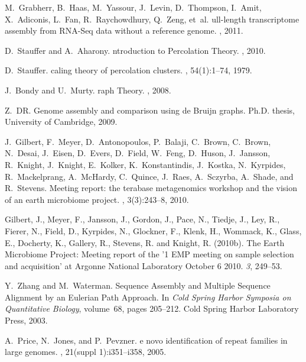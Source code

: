 \documentclass{pnastwo}
\begin{document}
\begin{article}
\begin{thebibliography}{10}
M.~Grabherr, B.~Haas, M.~Yassour, J.~Levin, D.~Thompson, I.~Amit, X.~Adiconis,
  L.~Fan, R.~Raychowdhury, Q.~Zeng, et~al.
ull-length transcriptome assembly from {R}{N}{A}-{S}eq data
  without a reference genome.
, 2011.

D.~Stauffer and A.~Aharony.
ntroduction to {P}ercolation {T}heory.
, 2010.

D.~Stauffer.
caling theory of percolation clusters.
, 54(1):1--74, 1979.

J.~Bondy and U.~Murty.
raph {T}heory.
, 2008.

Z.~DR.
\newblock Genome assembly and comparison using de {B}ruijn graphs.
\newblock Ph.D. thesis, University of Cambridge, 2009.

J.~Gilbert, F.~Meyer, D.~Antonopoulos, P.~Balaji, C.~Brown, C.~Brown, N.~Desai,
  J.~Eisen, D.~Evers, D.~Field, W.~Feng, D.~Huson, J.~Jansson, R.~Knight,
  J.~Knight, E.~Kolker, K.~Konstantindis, J.~Kostka, N.~Kyrpides,
  R.~Mackelprang, A.~McHardy, C.~Quince, J.~Raes, A.~Sczyrba, A.~Shade, and
  R.~Stevens.
\newblock Meeting report: the terabase metagenomics workshop and the vision of
  an earth microbiome project.
, 3(3):243--8, 2010.

Gilbert, J., Meyer, F., Jansson, J., Gordon, J., Pace, N., Tiedje, J., Ley, R.,
  Fierer, N., Field, D., Kyrpides, N., Glockner, F., Klenk, H., Wommack, K.,
  Glass, E., Docherty, K., Gallery, R., Stevens, R.  and Knight, R.
  (2010{\rm{b}}).
\newblock The Earth Microbiome Project: Meeting report of the '1 EMP meeting on
  sample selection and acquisition' at Argonne National Laboratory October 6
  2010.
 \emph{3}, 249--53.

Y.~Zhang and M.~Waterman.
 {S}equence {A}ssembly and {M}ultiple {S}equence {A}lignment
  by an {E}ulerian {P}ath {A}pproach.
\newblock In {\em Cold Spring Harbor Symposia on Quantitative Biology},
  volume~68, pages 205--212. Cold Spring Harbor Laboratory Press, 2003.

A.~Price, N.~Jones, and P.~Pevzner.
e novo identification of repeat families in large genomes.
, 21(suppl 1):i351--i358, 2005.


\end{thebibliography}
\end{article}
\end{document}
